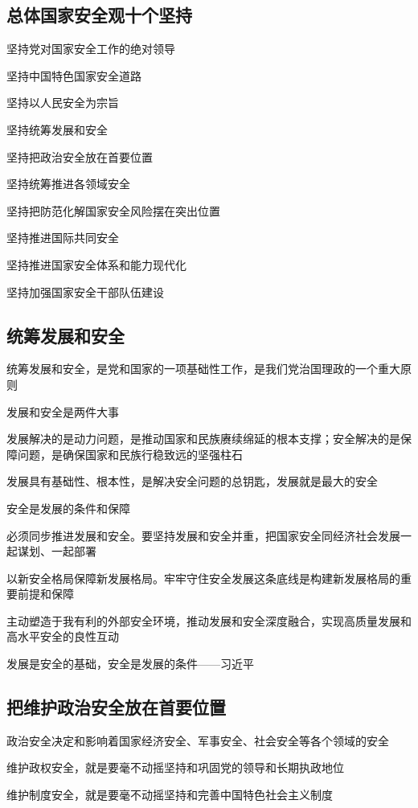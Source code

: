 \documentclass[11pt, a4paper]{article}
\begin{document}
\subsection*{总体国家安全观十个坚持}

坚持党对国家安全工作的绝对领导

坚持中国特色国家安全道路

坚持以人民安全为宗旨

坚持统筹发展和安全

坚持把政治安全放在首要位置

坚持统筹推进各领域安全

坚持把防范化解国家安全风险摆在突出位置

坚持推进国际共同安全

坚持推进国家安全体系和能力现代化

坚持加强国家安全干部队伍建设

\subsection*{统筹发展和安全}

统筹发展和安全，是党和国家的一项基础性工作，是我们党治国理政的一个重大原则

发展和安全是两件大事

发展解决的是动力问题，是推动国家和民族赓续绵延的根本支撑；安全解决的是保障问题，是确保国家和民族行稳致远的坚强柱石

发展具有基础性、根本性，是解决安全问题的总钥匙，发展就是最大的安全

安全是发展的条件和保障

必须同步推进发展和安全。要坚持发展和安全并重，把国家安全同经济社会发展一起谋划、一起部署

以新安全格局保障新发展格局。牢牢守住安全发展这条底线是构建新发展格局的重要前提和保障

主动塑造于我有利的外部安全环境，推动发展和安全深度融合，实现高质量发展和高水平安全的良性互动

发展是安全的基础，安全是发展的条件——习近平

\subsection*{把维护政治安全放在首要位置}

政治安全决定和影响着国家经济安全、军事安全、社会安全等各个领域的安全

维护政权安全，就是要毫不动摇坚持和巩固党的领导和长期执政地位

维护制度安全，就是要毫不动摇坚持和完善中国特色社会主义制度
\end{document}
